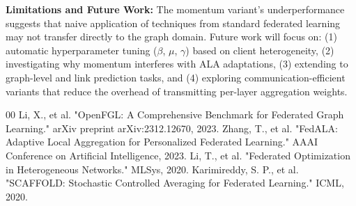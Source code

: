 \documentclass[10pt,conference,compsocconf,letterpaper]{IEEEtran}
\begin{document}
\textbf{Limitations and Future Work:} The momentum variant's underperformance suggests that naive application of techniques from standard federated learning may not transfer directly to the graph domain. Future work will focus on: (1) automatic hyperparameter tuning ($\beta$, $\mu$, $\gamma$) based on client heterogeneity, (2) investigating why momentum interferes with ALA adaptations, (3) extending to graph-level and link prediction tasks, and (4) exploring communication-efficient variants that reduce the overhead of transmitting per-layer aggregation weights.

\begin{thebibliography}{00}
 Li, X., et al. "OpenFGL: A Comprehensive Benchmark for Federated Graph Learning." arXiv preprint arXiv:2312.12670, 2023.
 Zhang, T., et al. "FedALA: Adaptive Local Aggregation for Personalized Federated Learning." AAAI Conference on Artificial Intelligence, 2023.
 Li, T., et al. "Federated Optimization in Heterogeneous Networks." MLSys, 2020.
 Karimireddy, S. P., et al. "SCAFFOLD: Stochastic Controlled Averaging for Federated Learning." ICML, 2020.
\end{thebibliography}
\end{document}
